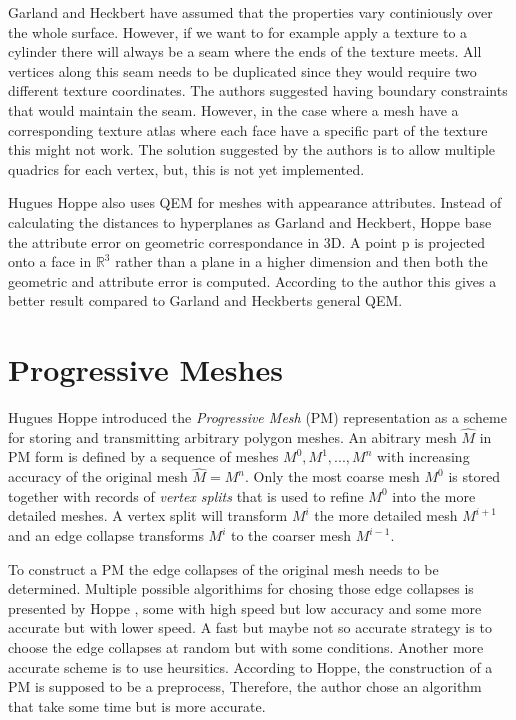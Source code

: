 Garland and Heckbert have assumed that the properties vary continiously over the whole surface. However, if we want to for example apply a texture to a cylinder there will always be a seam where the ends of the texture meets. All vertices along this seam needs to be duplicated since they would require two different texture coordinates. The authors suggested having boundary constraints that would maintain the seam. However, in the case where a mesh have a corresponding texture atlas where each face have a specific part of the texture this might not work. The solution suggested by the authors is to allow multiple quadrics for each vertex, but, this is not yet implemented.

Hugues Hoppe \cite{Hoppe:1999:NQM:319351.319357} also uses QEM for meshes with appearance attributes. Instead of calculating the distances to hyperplanes as Garland and Heckbert, Hoppe base the attribute error on geometric correspondance in 3D. A point p is projected onto a face in \(\mathbb{R}^3\) rather than a plane in a higher dimension and then both the geometric and attribute error is computed. According to the author this gives a better result compared to Garland and Heckberts general QEM.

\section{Progressive Meshes} \label{sec:progressive_meshes}
Hugues Hoppe \cite{hoppe1996progressive} introduced the \emph{Progressive Mesh} (PM) representation as a scheme for storing and transmitting arbitrary polygon meshes. An abitrary mesh $\hat{M}$ in PM form is defined by a sequence of meshes $M^0, M^1, ..., M^n$ with increasing accuracy of the original mesh $\hat{M} = M^n$. Only the most coarse mesh $M^0$ is stored together with records of \emph{vertex splits} that is used to refine $M^0$ into the more detailed meshes. A vertex split will transform $M^i$ the more detailed mesh $M^{i+1}$ and an edge collapse transforms $M^i$ to the coarser mesh $M^{i-1}$.

To construct a PM the edge collapses of the original mesh needs to be determined. Multiple possible algorithims for chosing those edge collapses is presented by Hoppe \cite{hoppe1996progressive}, some with high speed but low accuracy and some more accurate but with lower speed. A fast but maybe not so accurate strategy is to choose the edge collapses at random but with some conditions. Another more accurate scheme is to use heursitics. According to Hoppe, the construction of a PM is supposed to be a preprocess, Therefore, the author chose an algorithm that take some time but is more accurate.

